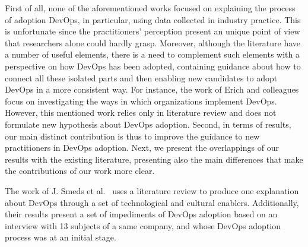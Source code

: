 

First of all, none of the aforementioned works focused on explaining the process of adoption DevOps,
in particular, using data collected in industry practice. This is unfortunate since the
practitioners' perception present an unique point of view that researchers
alone could hardly grasp. Moreover, although the literature have a number of
useful elements, there is a need to complement such elements with a perspective on how DevOps has
been adopted, containing guidance about how to connect all these isolated parts
and then enabling new candidates to adopt DevOps in a more consistent way. 
For instance, the work of Erich and colleagues~\cite{qualitative_devops_journalsw_17}
focus on investigating the ways in which organizations implement DevOps. 
However, this mentioned work relies only in literature review and does not formulate
new hypothesis about DevOps adoption. Second, 
in terms of results, our main distinct contribution is thus to improve the guidance
to new practitioners in DevOps adoption. 
Next, we present the overlappings of our
results with the existing literature, presenting also the main differences that 
make the contributions of our work more clear.

The work of J. Smeds et al.~\cite{devops_a_definition_xp_15} uses a literature
review to produce one explanation about DevOps through a set of technological and
cultural enablers. Additionally, their results 
present a set of impediments of DevOps adoption based on an interview with 13
subjects of a same company, and whose DevOps adoption process was at 
an initial stage.


